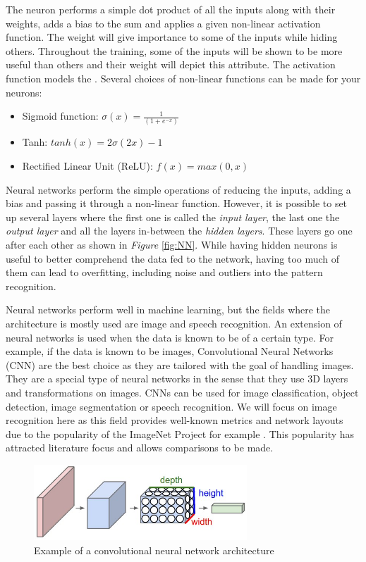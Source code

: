 The neuron performs a simple dot product of all the inputs along with their weights, adds a bias to the sum and applies a given non-linear activation function. The weight will give importance to some of the inputs while hiding others. Throughout the training, some of the inputs will be shown to be more useful than others and their weight will depict this attribute. The activation function models the . Several choices of non-linear functions can be made for your neurons:
\begin{itemize}
  \item Sigmoid function: $\sigma(x) = \frac{1}{(1+e^{-x})}$
  \item Tanh: $tanh(x) = 2\sigma(2x) - 1$
  \item Rectified Linear Unit (ReLU): $ f(x) = max(0,x) $
\end{itemize}

Neural networks perform the simple operations of reducing the inputs, adding a bias and passing it through a non-linear function. However, it is possible to set up several layers where the first one is called the \emph{input layer}, the last one the \emph{output layer} and all the layers in-between the \emph{hidden layers}. These layers go one after each other as shown in \emph{Figure} \ref{fig:NN}. While having hidden neurons is useful to better comprehend the data fed to the network, having too much of them can lead to overfitting, including noise and outliers into the pattern recognition.

Neural networks perform well in machine learning, but the fields where the architecture is mostly used are image and speech recognition. An extension of neural networks is used when the data is known to be of a certain type. For example, if the data is known to be images, Convolutional Neural Networks (CNN) are the best choice as they are tailored with the goal of handling images. They are a special type of neural networks in the sense that they use 3D layers and transformations on images. CNNs can be used for image classification, object detection, image segmentation or speech recognition. We will focus on image recognition here as this field provides well-known metrics and network layouts due to the popularity of the ImageNet Project for example \cite{ImageNet2009}. This popularity has attracted literature focus and allows comparisons to be made.

\begin{figure}[htbp]
	\centering
		\includegraphics[width=8cm]{Figures/CNN.png}
	\caption[Convolutional Neural Network Example]{Example of a convolutional neural network architecture \cite{Karpathy2015}}
	\label{fig:CNN}
\end{figure}

